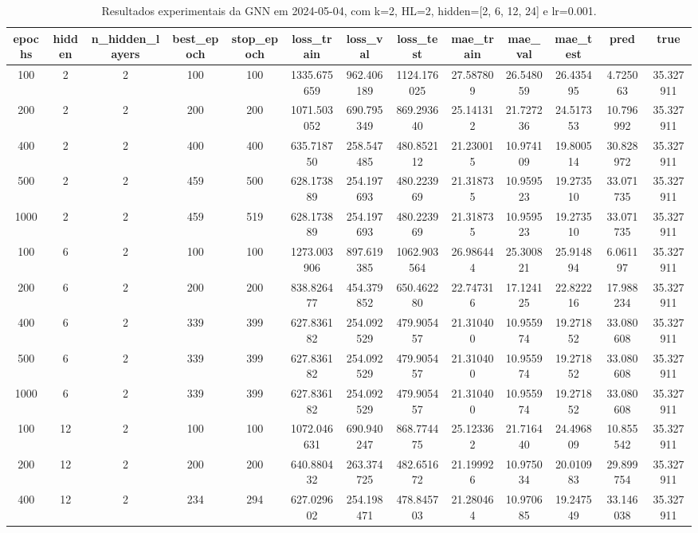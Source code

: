 \begin{table}[h]
\centering
\caption{Resultados experimentais da GNN em 2024-05-04, com k=2, HL=2, hidden=[2, 6, 12, 24] e lr=0.001.}
\label{tab:gnn_results_k2_hl2_d20240504}
\begin{tabular}{ccccccccccccc}
\toprule
epochs & hidden & n\_hidden\_layers & best\_epoch & stop\_epoch & loss\_train & loss\_val & loss\_test & mae\_train & mae\_val & mae\_test & pred & true \\
\midrule
100 & 2 & 2 & 100 & 100 & 1335.675659 & 962.406189 & 1124.176025 & 27.587809 & 26.548059 & 26.435495 & 4.725063 & 35.327911 \\
200 & 2 & 2 & 200 & 200 & 1071.503052 & 690.795349 & 869.293640 & 25.141312 & 21.727236 & 24.517353 & 10.796992 & 35.327911 \\
400 & 2 & 2 & 400 & 400 & 635.718750 & 258.547485 & 480.852112 & 21.230015 & 10.974109 & 19.800514 & 30.828972 & 35.327911 \\
500 & 2 & 2 & 459 & 500 & 628.173889 & 254.197693 & 480.223969 & 21.318735 & 10.959523 & 19.273510 & 33.071735 & 35.327911 \\
1000 & 2 & 2 & 459 & 519 & 628.173889 & 254.197693 & 480.223969 & 21.318735 & 10.959523 & 19.273510 & 33.071735 & 35.327911 \\
100 & 6 & 2 & 100 & 100 & 1273.003906 & 897.619385 & 1062.903564 & 26.986444 & 25.300821 & 25.914894 & 6.061197 & 35.327911 \\
200 & 6 & 2 & 200 & 200 & 838.826477 & 454.379852 & 650.462280 & 22.747316 & 17.124125 & 22.822216 & 17.988234 & 35.327911 \\
400 & 6 & 2 & 339 & 399 & 627.836182 & 254.092529 & 479.905457 & 21.310400 & 10.955974 & 19.271852 & 33.080608 & 35.327911 \\
500 & 6 & 2 & 339 & 399 & 627.836182 & 254.092529 & 479.905457 & 21.310400 & 10.955974 & 19.271852 & 33.080608 & 35.327911 \\
1000 & 6 & 2 & 339 & 399 & 627.836182 & 254.092529 & 479.905457 & 21.310400 & 10.955974 & 19.271852 & 33.080608 & 35.327911 \\
100 & 12 & 2 & 100 & 100 & 1072.046631 & 690.940247 & 868.774475 & 25.123362 & 21.716440 & 24.496809 & 10.855542 & 35.327911 \\
200 & 12 & 2 & 200 & 200 & 640.880432 & 263.374725 & 482.651672 & 21.199926 & 10.975034 & 20.010983 & 29.899754 & 35.327911 \\
400 & 12 & 2 & 234 & 294 & 627.029602 & 254.198471 & 478.845703 & 21.280464 & 10.970685 & 19.247549 & 33.146038 & 35.327911 \\

\end{tabular}
\end{table}
